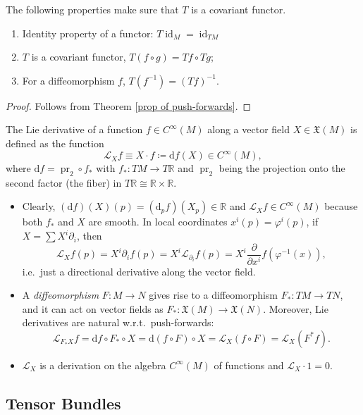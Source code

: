 \documentclass[english,letterpaper]{article}%
\numberwithin{equation}{section}
\numberwithin{figure}{section}
\numberwithin{table}{section}
\theoremstyle{definition}
\theoremstyle{definition}
\theoremstyle{definition}
\theoremstyle{plain}
\theoremstyle{plain}
\theoremstyle{plain}
\theoremstyle{plain}
\theoremstyle{remark}
\theoremstyle{remark}
\newcommand{\dd}{{\mathrm{d}}}
\DeclareMathOperator{\id}{id}
\DeclareMathOperator{\proj}{pr}
\newcommand{\Lie}{\mathcal{L}}
\newcommand{\fX}{\mathfrak{X}}
\begin{document}
\begin{prop}
The following properties make sure that $T$ is a covariant functor.
\begin{enumerate}
    \item Identity property of a functor: $T\id_M=\id_{TM}$
    \item $T$ is a covariant functor, $T(f\circ g)=Tf\circ Tg$;
    \item For a diffeomorphism $f$, $T(f^{-1})=(Tf)^{-1}$.
\end{enumerate}
\end{prop}
\begin{proof}
Follows from Theorem \ref{prop of push-forwards}.
\end{proof}


\begin{defn}
The Lie derivative of a function $f\in C^\infty(M)$ along a vector field $X\in\fX(M)$ is defined as the function \[\Lie_X f\equiv X\cdot f\coloneqq \dd f (X)\in C^\infty(M),\] where $\dd f=\proj_2\circ f_\ast$ with $f_\ast:TM\to T\mathbb{R}$ and $\proj_2$ being the projection onto the second factor (the fiber) in $T\mathbb{R}\cong \mathbb{R}\times\mathbb{R}$. \label{def of Lie derivative}
\end{defn}

\begin{itemize}
    \item Clearly, $(\dd f)(X)(p)=(\dd_p f)(X_p)\in \mathbb{R}$ and $\Lie_X f\in C^\infty (M)$ because both $f_\ast$ and $X$ are smooth. In local coordinates $x^i(p)=\varphi^i(p)$, if $X=\sum X^i \partial_i$, then 
    \[\Lie_X f(p)=X^i\partial_i f(p)=X^i\Lie_{\partial_i}f(p)=X^i \frac{\partial}{\partial x^i}f(\varphi^{-1}(x)),\]
    i.e.\ just a directional derivative along the vector field.
    \item A \emph{diffeomorphism} $F:M\to N$ gives rise to a diffeomorphism $F_\ast:TM\to TN$, and it can act on vector fields as $F_\ast :\fX(M)\to \fX(N)$. Moreover, Lie derivatives are natural w.r.t.\ push-forwards: 
    \[
    \Lie_{F_\ast X}f=\dd f\circ F_\ast\circ X=\dd (f\circ F)\circ X=\Lie_X (f\circ F)=\Lie_X (F^\ast f).
    \]
    \item $\Lie_X$ is a derivation on the algebra $C^\infty(M)$ of functions and $\Lie_X\cdot 1=0$.
\end{itemize}


\subsection{Tensor Bundles}
\end{document}
